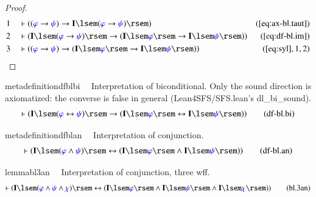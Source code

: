 \begin{proof}
\begin{align}
  1 &&  & \vdash ( ( \mw{\varphi} \rightarrow \mw{\psi} ) \rightarrow
      \mathbf{I} \lsem ( \mw{\varphi} \rightarrow \mw{\psi} ) \rsem
      )&(\mbox{\ref{eq:ax-bl.taut}})\notag
  \\ 2 &&  & \vdash ( \mathbf{I} \lsem ( \mw{\varphi} \rightarrow
      \mw{\psi} ) \rsem \rightarrow ( \mathbf{I} \lsem \mw{\varphi}
      \rsem \rightarrow \mathbf{I} \lsem \mw{\psi} \rsem )
      )&(\mbox{\ref{eq:df-bl.im}})\notag
  \\ 3 &&  & \vdash ( ( \mw{\varphi} \rightarrow \mw{\psi} )
      \rightarrow ( \mathbf{I} \lsem \mw{\varphi} \rsem \rightarrow
      \mathbf{I} \lsem \mw{\psi} \rsem )
      )&(\mbox{\ref{eq:syl}},1,2)\notag
\end{align}
\end{proof}

\begin{restatable}{metadefinition}{dfblbi}~~ Interpretation of biconditional.  Only
the sound direction is axiomatized: the converse is false in general
(Lean4SFS/SFS.lean's dl\_bi\_sound).
\begin{align}
\vdash ( \mathbf{I} \lsem ( \mw{\varphi} \leftrightarrow \mw{\psi} ) \rsem
    \rightarrow ( \mathbf{I} \lsem \mw{\varphi} \rsem \leftrightarrow
    \mathbf{I} \lsem \mw{\psi} \rsem ) )\label{eq:df-bl.bi}\tag{df-bl.bi}
\end{align}
\end{restatable}

\begin{restatable}{metadefinition}{dfblan}~~ Interpretation of conjunction.
\begin{align}
\vdash ( \mathbf{I} \lsem ( \mw{\varphi} \wedge \mw{\psi} ) \rsem
    \leftrightarrow ( \mathbf{I} \lsem \mw{\varphi} \rsem \wedge \mathbf{I}
    \lsem \mw{\psi} \rsem ) )\label{eq:df-bl.an}\tag{df-bl.an}
\end{align}
\end{restatable}

\begin{restatable}{lemma}{bl3an}~~ Interpretation of conjunction, three wff.
\begin{align}
\vdash ( \mathbf{I} \lsem ( \mw{\varphi} \wedge \mw{\psi} \wedge \mw{\chi} )
    \rsem \leftrightarrow ( \mathbf{I} \lsem \mw{\varphi} \rsem \wedge
    \mathbf{I} \lsem \mw{\psi} \rsem \wedge \mathbf{I} \lsem \mw{\chi} \rsem )
    )\label{eq:bl.3an}\tag{bl.3an}
\end{align}
\end{restatable}

